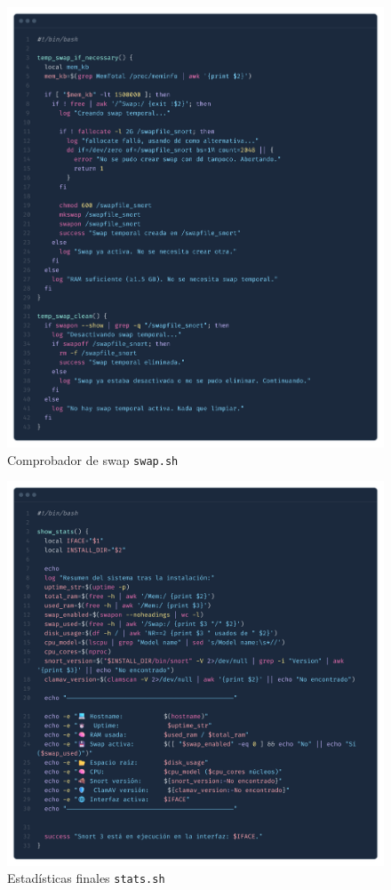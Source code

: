 \documentclass[12pt,a4paper]{report}
\begin{document}
\begin{figure}[H]
	\centering
	\includegraphics[scale=0.12]{script_automatico/10.png}
	\caption{Comprobador de swap \texttt{swap.sh}}
	\label{fig:swap-sh}
\end{figure}

\begin{figure}[H]
	\centering
	\includegraphics[scale=0.12]{script_automatico/9.png}
	\caption{Estadísticas finales \texttt{stats.sh}}
	\label{fig:stats-sh}
\end{figure}
\end{document}

